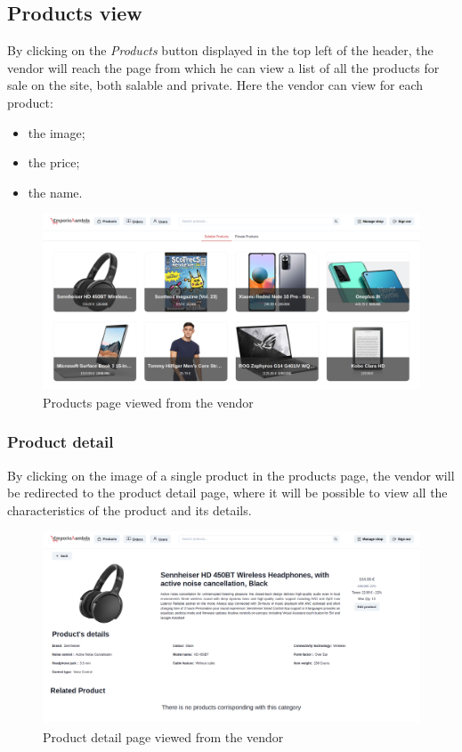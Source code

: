\subsection{Products view}
By clicking on the \textit{Products} button displayed in the top left of the header, the vendor will reach the page from which he can view a list of all the products for sale on the site, both salable and private.
Here the vendor can view for each product:
\begin{itemize}
    \item the image;
    \item the price;
    \item the name.
\end{itemize}
\begin{figure}[!ht]
    \caption{Products page viewed from the vendor}
    \vspace{5px}
    \includegraphics[scale=0.25]{../../../../Images/userManual/productsVendor.png}
    \centering
\end{figure}
\pagebreak
\subsubsection{Product detail}
By clicking on the image of a single product in the products page, the vendor will be redirected to the product detail page, where it will be possible to view all the characteristics of the product and its details.
\begin{figure}[!ht]
    \caption{Product detail page viewed from the vendor}
    \vspace{5px}
    \includegraphics[scale=0.25]{../../../../Images/userManual/productDetailVendor.png}
    \centering
\end{figure}
\pagebreak
